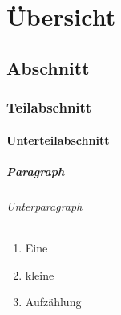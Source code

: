 
\chapter{Übersicht}
\section{Abschnitt}
\subsection{Teilabschnitt}
\subsubsection{Unterteilabschnitt}
\paragraph{Paragraph}
\subparagraph{Unterparagraph}

\begin{enumerate}
     \item Eine
     \item kleine
     \item Aufzählung
\end{enumerate}

%
